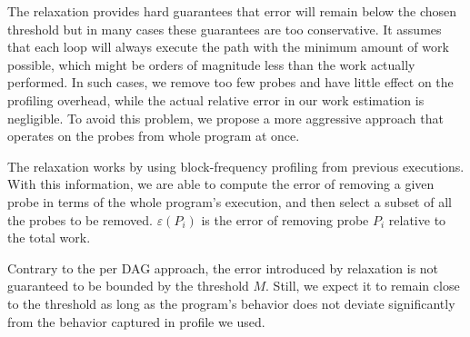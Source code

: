 The \WCRelaxLower relaxation provides hard guarantees that error will remain below the chosen threshold but in many cases these
guarantees are too conservative. It assumes that each loop will always execute the path with the minimum amount of work
possible, which might be orders of magnitude less than the work actually performed. In such cases, we remove too few probes and have little
effect on the profiling overhead, while the actual relative error in our work estimation is negligible. To avoid this problem, we
propose a more aggressive approach that operates on the probes from whole program at once.

The \WPRelaxLower relaxation works by using block-frequency profiling from previous executions. With this information, we are able to
compute the error of removing a given probe in terms of the whole program's execution, and then select a subset of all the probes to be
removed. $\varepsilon(P_i)$ is the error of removing probe $P_i$ relative to the total work.

Contrary to the per DAG approach, the error introduced by \WPRelaxLower relaxation is not guaranteed to be bounded by the threshold $M$.
Still, we expect it to remain close to the threshold as long as the program's behavior does not deviate significantly from the behavior
captured in profile we used.
